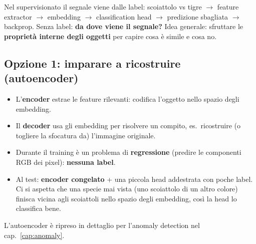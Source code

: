 Nel supervisionato il segnale viene dalle label: scoiattolo vs tigre $\to$ feature extractor $\to$ embedding $\to$ classification head
$\to$ predizione sbagliata $\to$ backprop. Senza label: \textbf{da dove viene il segnale?}
Idea generale: sfruttare le \textbf{proprietà interne degli oggetti} per capire cosa è simile e cosa no.

\subsection{Opzione 1: imparare a ricostruire (autoencoder)}
\begin{itemize}
  \item L'\textbf{encoder} estrae le feature rilevanti: codifica l'oggetto nello spazio degli embedding.
  \item Il \textbf{decoder} usa gli embedding per risolvere un compito, es.\ ricostruire (o togliere la sfocatura da) l'immagine originale.
  \item Durante il training è un problema di \textbf{regressione} (predire le componenti RGB dei pixel): \textbf{nessuna label}.
  \item Al test: \textbf{encoder congelato} + una piccola head addestrata con poche label. Ci si aspetta che una specie mai vista (uno scoiattolo
        di un altro colore) finisca vicina agli scoiattoli nello spazio degli embedding, così la head lo classifica bene.
\end{itemize}
L'autoencoder è ripreso in dettaglio per l'anomaly detection nel cap.~\ref{cap:anomaly}.

